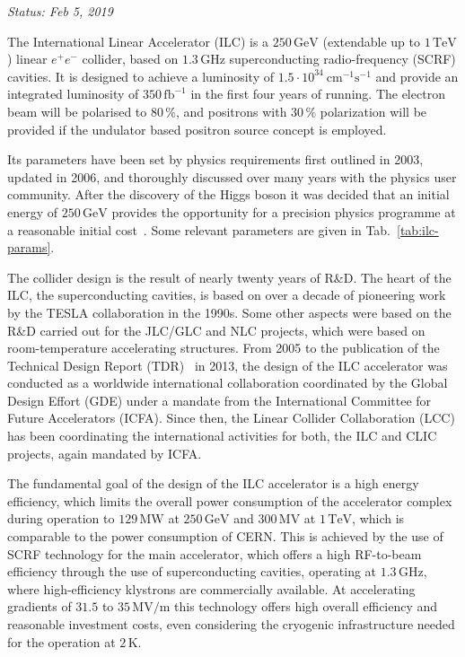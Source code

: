 
{\it Status: Feb 5, 2019}

The International Linear Accelerator (ILC) is a $250\,{\mathrm{GeV}}$ (extendable up to $1\,{\mathrm{TeV}}$) linear $e^+e^-$ collider, based on $1.3\,{\mathrm{GHz}}$ superconducting radio-frequency (SCRF) cavities.
It is designed to  achieve a luminosity of $1.5\cdot 10^{34}~{\mathrm{cm}}^{-1}{\mathrm{s}}^{-1}$ and provide an integrated luminosity of $350\,{\mathrm{fb}}^{-1}$ in the first four years of running.
The electron beam will be polarised to $80\,\%$, and positrons with $30\,\%$ polarization will be provided if the undulator based positron source concept is employed. 

Its parameters have been set by physics requirements first outlined in 2003,
updated in 2006, and thoroughly discussed over many years with the physics user community. 
After the discovery of the Higgs boson it was decided that an initial energy of $250\,{\mathrm{GeV}}$ provides the opportunity for a precision physics programme at a reasonable initial cost~\cite{Evans:2017rvt}.
Some relevant parameters are given in Tab.~\ref{tab:ilc-params}.

The collider design is the result of nearly twenty years of R\&D. 
The heart of the ILC, the superconducting cavities, is based on over a decade of pioneering work by the TESLA collaboration in the 1990s. 
Some other aspects were based on the R\&D carried out for the JLC/GLC and NLC projects, which were based on room-temperature accelerating structures. 
From 2005 to the publication of the Technical Design Report (TDR)~\cite{Adolphsen:2013kya} in 2013, the design of the ILC accelerator was conducted as a worldwide international collaboration coordinated by the Global Design Effort (GDE) under a mandate from the International Committee for Future Accelerators (ICFA).
Since then, the Linear Collider Collaboration (LCC) has been coordinating the international activities for both, the ILC and CLIC projects, again mandated by ICFA.

The fundamental goal of the design of the ILC accelerator is a high energy efficiency, which limits the overall power consumption of the accelerator complex during operation to $129\,{\mathrm{MW}}$ at  $250\,{\mathrm{GeV}}$ and $300\,{\mathrm{MV}}$ at  $1\,{\mathrm{TeV}}$, which is comparable to the power consumption of CERN.
This is achieved by the use of SCRF technology for the main accelerator, which offers a high RF-to-beam efficiency through the use of superconducting cavities, operating at $1.3\,{\mathrm{GHz}}$, where high-efficiency klystrons are commercially available.
At accelerating gradients of $31.5$ to $35\,{\mathrm{MV/m}}$ this technology offers high overall efficiency and reasonable investment costs, even considering the cryogenic infrastructure needed for the operation at $2\,{\mathrm{K}}$.

